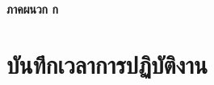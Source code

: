 \clearpage 
\thispagestyle{empty}
\begin{center}
	\LARGE{\textbf{ภาคผนวก ก}}
\end{center}

	\chapter{บันทึกเวลาการปฏิบัติงาน}


